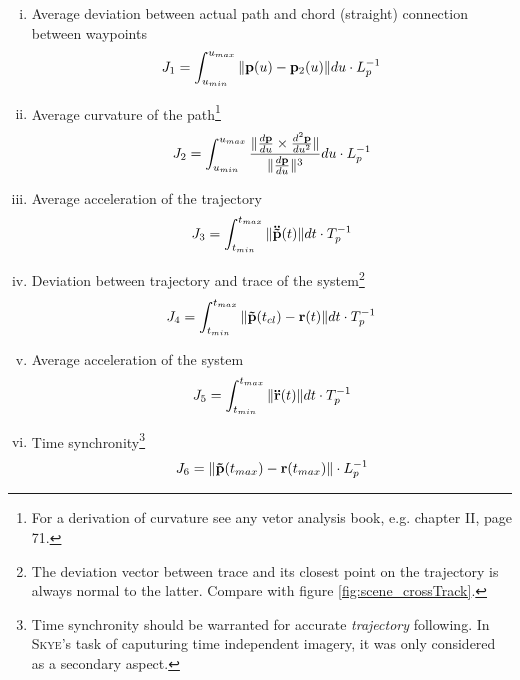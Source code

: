 \begin{enumerate}[i)] 
\item Average deviation between actual path and chord (straight) connection between waypoints
\label{item:static_deviation}
\begin{equation}
J_1 = \int_{u_{min}}^{u_{max}} \|{\bf p}(u)- {\bf p}_2(u)\| du \cdot L_p^{-1} \label{eq:static_deviation}
\end{equation}

\item Average curvature of the path\footnote{For a derivation of curvature see any vetor analysis book, e.g. \cite{stammbach} chapter II, page 71.}
\label{item:static_curvature}
\begin{equation}
J_2 = \int_{u_{min}}^{u_{max}} \frac{\| \frac{d {\bf p}}{du} \times \frac{d^{2} {\bf p}}{du^{2}} \|}{\|  \frac{d {\bf p}}{du} \|^3}du \cdot L_p^{-1}
\label{eq:static_curvature}
\end{equation}

\item Average acceleration of the trajectory
\label{item:static_acceleration}
\begin{equation}
J_3 = \int_{t_{min}}^{t_{max}} \|{\bf \ddot{\tilde{p}}}(t)\| dt \cdot T_p^{-1} \label{eq:static_acceleration}
\end{equation}

\item Deviation between trajectory and trace of the system\footnote{The deviation vector between trace and its closest point on the trajectory is always normal to the latter. Compare with figure \ref{fig:scene_crossTrack}.}
\label{item:dynamic_deviation}
\begin{equation}
J_4 = \int_{t_{min}}^{t_{max}} \| {\bf \tilde{p}}(t_{cl}) - {\bf r}(t) \| dt \cdot T_p^{-1} 
\label{eq:dynamic_deviation}
\end{equation}

\item Average acceleration of the system
\label{item:dynamic_acceleration}
\begin{equation}
J_5 = \int_{t_{min}}^{t_{max}} \|{\bf \ddot{r}}(t)\| dt \cdot T_p^{-1}
\end{equation}

\item Time synchronity\footnote{Time synchronity should be warranted for accurate \textit{trajectory} following. In \textsc{Skye}'s task of caputuring time independent imagery, it was only considered as a secondary aspect.}
\label{item:dynamic_synchronity}
\begin{equation}
J_6 = \| {\bf \tilde{p}}(t_{max}) - {\bf r}(t_{max}) \| \cdot L_p^{-1} \label{eq:dynamic_synchronity}
\end{equation}

\end{enumerate}


